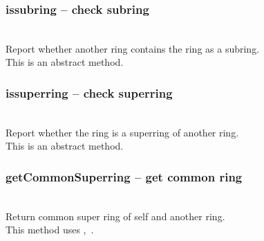   \subsubsection{issubring -- check subring}
   \\
   \spacing
   \quad Report whether another ring contains the ring as a subring.\\
   \spacing
   \quad This is an abstract method.\\
   \spacing
  \subsubsection{issuperring -- check superring}
   \\
   \spacing
   \quad Report whether the ring is a superring of another ring.\\
   \spacing
   \quad This is an abstract method.\\
   \spacing
  \subsubsection{getCommonSuperring -- get common ring}
   \\
   \spacing
   \quad Return common super ring of self and another ring.\\
   \spacing
   \quad This method uses ,\ .\\
   \spacing
\C

